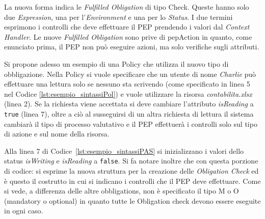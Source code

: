 La nuova forma indica le \emph{Fulfilled Obligation} di tipo Check. Queste hanno solo due \emph{Expression}, una per
l'\emph{Environment} e una per lo \emph{Status}. I due termini esprimono i controlli che deve effettuare il \ac{PEP}
prendendo i valori dal \emph{Context Handler}. Le nuove \emph{Fulfilled Obligation} sono prive di pepAction in quanto,
come enunciato prima, il \ac{PEP} non può eseguire azioni, ma solo verifiche sugli attributi.\par
\vspace{3mm}
Si propone adesso un esempio di una Policy che utilizza il nuovo tipo di obbligazione.
Nella Policy si vuole specificare che un utente di nome \emph{Charlie} può effettuare una lettura
solo se nessuno sta scrivendo (come specificato in linea 5 nel Codice \ref{lst:esempio_sintassiPol})
e vuole utilizzare la risorsa \emph{contabilita.xlsx} (linea 2).
Se la richiesta viene accettata si deve cambiare l'attributo \emph{isReading} a \texttt{true} (linea 7), oltre a ciò al susseguirsi
di un altra richiesta di lettura il sistema cambiarà il tipo di processo valutativo e il \ac{PEP} effettuerà i controlli
solo sul tipo di azione e sul nome della risorsa.\par

\clearpage

\vspace{1em}
Alla linea 7 di Codice~\ref{lst:esempio_sintassiPAS} si inizializzano i valori dello status
\emph{isWriting} e \emph{isReading} a \texttt{false}.
Si fa notare inoltre che con questa porzione di codice:
\label{lst:esempio_sintassi}
\vspace{1em}
si esprime la nuova struttura per la creazione delle \emph{Obligation Check} ed è questo il costrutto
in cui si indicano i controlli che il \ac{PEP} deve effettuare. Come si vede, a differenza delle altre
obbligations, non è specificato il tipo M o O (mandatory o optional) in quanto tutte le Obligation check
devono essere eseguite in ogni caso.
